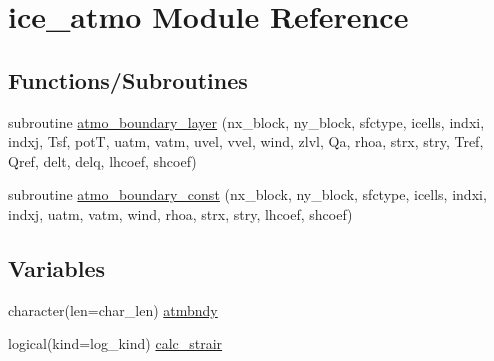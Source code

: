 \hypertarget{namespaceice__atmo}{
\section{ice\_\-atmo Module Reference}
\label{namespaceice__atmo}
}
\subsection*{Functions/Subroutines}
\begin{DoxyCompactItemize}
\item 
subroutine \hyperlink{namespaceice__atmo_a0064e438c4aa02621fad02322d62875a}{atmo\_\-boundary\_\-layer} (nx\_\-block, ny\_\-block, sfctype, icells, indxi, indxj, Tsf, potT, uatm, vatm, uvel, vvel, wind, zlvl, Qa, rhoa, strx, stry, Tref, Qref, delt, delq, lhcoef, shcoef)
\item 
subroutine \hyperlink{namespaceice__atmo_a7f029ec02aa35ba56d71f83914b70a76}{atmo\_\-boundary\_\-const} (nx\_\-block, ny\_\-block, sfctype, icells, indxi, indxj, uatm, vatm, wind, rhoa, strx, stry, lhcoef, shcoef)
\end{DoxyCompactItemize}
\subsection*{Variables}
\begin{DoxyCompactItemize}
\item 
character(len=char\_\-len) \hyperlink{namespaceice__atmo_aae4bd7119f41531a5beba8ea5f03c805}{atmbndy}
\item 
logical(kind=log\_\-kind) \hyperlink{namespaceice__atmo_a114305e959bca27e073f74995bf55855}{calc\_\-strair}
\end{DoxyCompactItemize}


